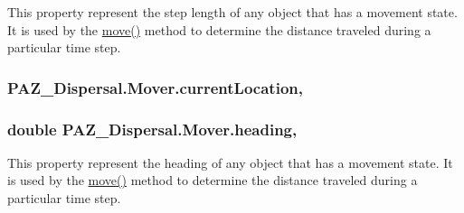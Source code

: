 This property represent the step length of any object that has a movement state. It is used by the \hyperlink{class_p_a_z___dispersal_1_1_mover_a04569135e604bce393016fe205025389}{move()} method to determine the distance traveled during a particular time step. 

\hypertarget{class_p_a_z___dispersal_1_1_mover_a40bf8a68b88ec18b2c8eec3deab81d36}{
\subsubsection[{current\-Location}]{ P\-A\-Z\-\_\-\-Dispersal.\-Mover.\-current\-Location\hspace{0.3cm}{\ttfamily [get]}, {\ttfamily [set]}}}\label{class_p_a_z___dispersal_1_1_mover_a40bf8a68b88ec18b2c8eec3deab81d36}
\hypertarget{class_p_a_z___dispersal_1_1_mover_ac20334b4c2d135dbd5dce2642618316f}{
\subsubsection[{heading}]{\setlength{\rightskip}{0pt plus 5cm}double P\-A\-Z\-\_\-\-Dispersal.\-Mover.\-heading\hspace{0.3cm}{\ttfamily [get]}, {\ttfamily [set]}}}\label{class_p_a_z___dispersal_1_1_mover_ac20334b4c2d135dbd5dce2642618316f}


This property represent the heading of any object that has a movement state. It is used by the \hyperlink{class_p_a_z___dispersal_1_1_mover_a04569135e604bce393016fe205025389}{move()} method to determine the distance traveled during a particular time step. 

